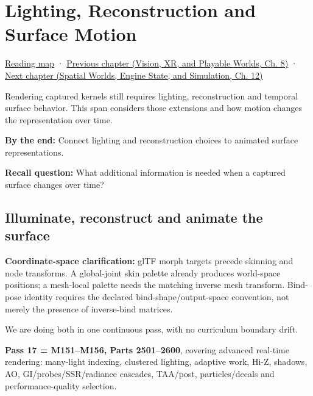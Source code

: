 \chapter{Lighting, Reconstruction and Surface Motion}\label{04-visual-computing-ii-ch040-lighting-reconstruction-and-surface-motion}\hypertarget{04-visual-computing-ii-ch040}{}\label{stagechapter:04-visual-computing-ii-ch040}

\hypertarget{04-visual-computing-ii-ch040-lighting-reconstruction-and-surface-motion}{}

\hyperref[volume-reading-map]{Reading map} · \href{../07-Vision-XR-and-Playable-Worlds/main.pdf\#nameddest=04-visual-computing-ii-ch039-tiling-ordering-and-compositing-at-scale}{Previous chapter (Vision, XR, and Playable Worlds, Ch. 8)} · \href{../05-Spatial-Worlds-Engine-State-and-Simulation/main.pdf\#nameddest=04-visual-computing-ii-ch041-per-vertex-and-per-corner-mesh-attributes}{Next chapter (Spatial Worlds, Engine State, and Simulation, Ch. 12)}

Rendering captured kernels still requires lighting, reconstruction and temporal surface behavior. This span considers those extensions and how motion changes the representation over time.

\textbf{By the end:} Connect lighting and reconstruction choices to animated surface representations.

\textbf{Recall question:} What additional information is needed when a captured surface changes over time?

\section{Illuminate, reconstruct and animate the surface}\label{04-visual-computing-ii-ch040-illuminate-reconstruct-and-animate-the-surface}

\hypertarget{04-visual-computing-ii-ch040-illuminate-reconstruct-and-animate-the-surface}{}

\textbf{Coordinate-space clarification:} glTF morph targets precede skinning and node transforms. A global-joint skin palette already produces world-space positions; a mesh-local palette needs the matching inverse mesh transform. Bind-pose identity requires the declared bind-shape/output-space convention, not merely the presence of inverse-bind matrices.

We are doing both in one continuous pass, with no curriculum boundary drift.

\textbf{Pass 17 = M151--M156, Parts 2501--2600}, covering advanced real-time rendering: many-light indexing, clustered lighting, adaptive work, Hi-Z, shadows, AO, GI/probes/SSR/radiance cascades, TAA/post, particles/decals and performance-quality selection.

